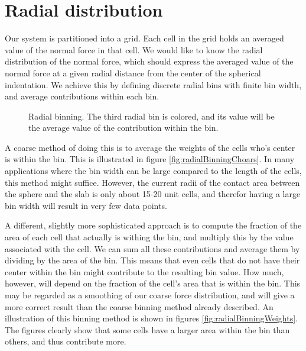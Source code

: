 \documentclass[twoside,english]{uiofysmaster}
\begin{document}
\section{Radial distribution}
Our system is partitioned into a grid. 
Each cell in the grid holds an averaged value of the normal force in that cell. 
We would like to know the radial distribution of the normal force, which should express the averaged value of the normal force at a given radial distance from the center of the spherical indentation.
We achieve this by defining discrete radial bins with finite bin width, and average contributions within each bin.
\begin{figure}
	\centering
	\resizebox{0.5\linewidth}{!}{
		
	}
	\caption{Radial binning. The third radial bin is colored, and its value will be the average value of the contribution within the bin.}%
	\label{fig:radialBinningSmooth}
\end{figure}
A coarse method of doing this is to average the weights of the cells who's center is within the bin. 
This is illustrated in figure \ref{fig:radialBinningChoars}. 
In many applications where the bin width can be large compared to the length of the cells, this method might suffice.
However, the current radii of the contact area between the sphere and the slab is only about 15-20 unit cells, and therefor having a large bin width will result in very few data points. 


A different, slightly more sophisticated approach is to compute the fraction of the area of each cell that actually is withing the bin, and multiply this by the value associated with the cell.
We can sum all these contributions and average them by dividing by the area of the bin. 
This means that even cells that do not have their center within the bin might contribute to the resulting bin value. 
How much, however, will depend on the fraction of the cell's area that is within the bin.
This may be regarded as a smoothing of our coarse force distribution, and will give a more correct result than the coarse binning method already described. 
An illustration of this binning method is shown in figures \ref{fig:radialBinningWeights}.
The figures clearly show that some cells have a larger area within the bin than others, and thus contribute more. 
\end{document}
